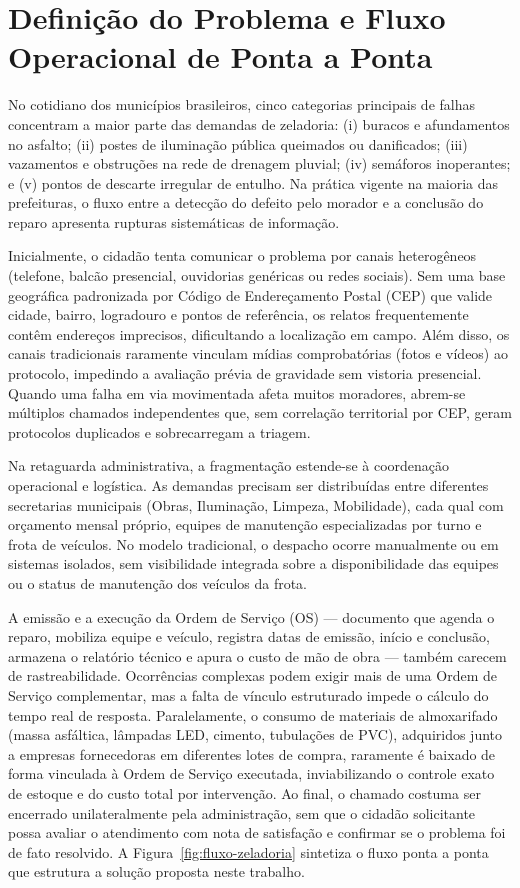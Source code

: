 \section{Definição do Problema e Fluxo Operacional de Ponta a Ponta}
\label{sec:definicao-fluxo}

No cotidiano dos municípios brasileiros, cinco categorias principais de falhas concentram a maior parte das demandas de zeladoria: (i) buracos e afundamentos no asfalto; (ii) postes de iluminação pública queimados ou danificados; (iii) vazamentos e obstruções na rede de drenagem pluvial; (iv) semáforos inoperantes; e (v) pontos de descarte irregular de entulho. Na prática vigente na maioria das prefeituras, o fluxo entre a detecção do defeito pelo morador e a conclusão do reparo apresenta rupturas sistemáticas de informação.

Inicialmente, o cidadão tenta comunicar o problema por canais heterogêneos (telefone, balcão presencial, ouvidorias genéricas ou redes sociais). Sem uma base geográfica padronizada por Código de Endereçamento Postal (CEP) que valide cidade, bairro, logradouro e pontos de referência, os relatos frequentemente contêm endereços imprecisos, dificultando a localização em campo. Além disso, os canais tradicionais raramente vinculam mídias comprobatórias (fotos e vídeos) ao protocolo, impedindo a avaliação prévia de gravidade sem vistoria presencial. Quando uma falha em via movimentada afeta muitos moradores, abrem-se múltiplos chamados independentes que, sem correlação territorial por CEP, geram protocolos duplicados e sobrecarregam a triagem.

Na retaguarda administrativa, a fragmentação estende-se à coordenação operacional e logística. As demandas precisam ser distribuídas entre diferentes secretarias municipais (Obras, Iluminação, Limpeza, Mobilidade), cada qual com orçamento mensal próprio, equipes de manutenção especializadas por turno e frota de veículos. No modelo tradicional, o despacho ocorre manualmente ou em sistemas isolados, sem visibilidade integrada sobre a disponibilidade das equipes ou o status de manutenção dos veículos da frota.

A emissão e a execução da Ordem de Serviço (OS) --- documento que agenda o reparo, mobiliza equipe e veículo, registra datas de emissão, início e conclusão, armazena o relatório técnico e apura o custo de mão de obra --- também carecem de rastreabilidade. Ocorrências complexas podem exigir mais de uma Ordem de Serviço complementar, mas a falta de vínculo estruturado impede o cálculo do tempo real de resposta. Paralelamente, o consumo de materiais de almoxarifado (massa asfáltica, lâmpadas LED, cimento, tubulações de PVC), adquiridos junto a empresas fornecedoras em diferentes lotes de compra, raramente é baixado de forma vinculada à Ordem de Serviço executada, inviabilizando o controle exato de estoque e do custo total por intervenção. Ao final, o chamado costuma ser encerrado unilateralmente pela administração, sem que o cidadão solicitante possa avaliar o atendimento com nota de satisfação e confirmar se o problema foi de fato resolvido. A Figura~\ref{fig:fluxo-zeladoria} sintetiza o fluxo ponta a ponta que estrutura a solução proposta neste trabalho.

